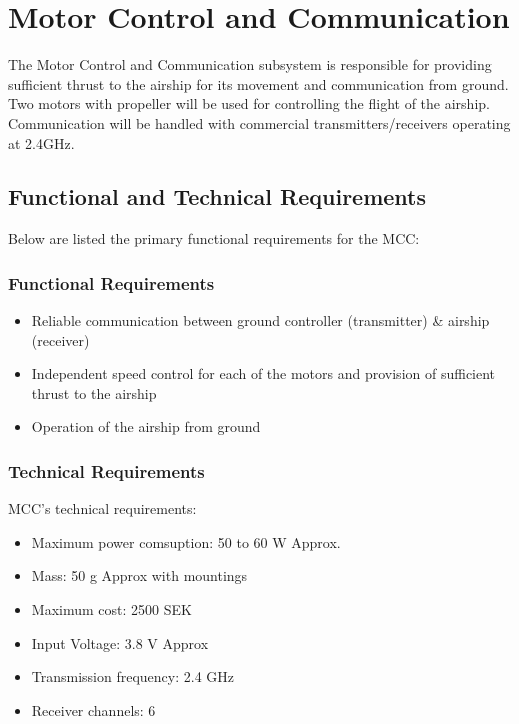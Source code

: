 \chapter{Motor Control and Communication}
\label{chap:mcc}
The Motor Control and Communication subsystem is responsible for providing sufficient thrust to the airship for its movement and communication from ground. Two motors with propeller will be used for controlling the flight of the airship. Communication will be handled with commercial transmitters/receivers operating at 2.4GHz. 

\section{Functional and Technical Requirements}

Below are listed the primary functional requirements for the MCC:

\subsection{Functional Requirements}

\begin{itemize}
\item Reliable communication between ground controller (transmitter) \& airship (receiver)
\item Independent speed control for each of the motors and provision of sufficient thrust to the airship
\item Operation of the airship from ground 
\end{itemize}


\subsection{Technical Requirements}

MCC's technical requirements:

\begin{itemize}
\item Maximum power comsuption: 50 to 60 W Approx. 
\item Mass: 50 g Approx with mountings
\item Maximum cost: 2500 SEK
\item Input Voltage: 3.8 V Approx
\item Transmission frequency: 2.4 GHz
\item Receiver channels: 6
\end{itemize}

